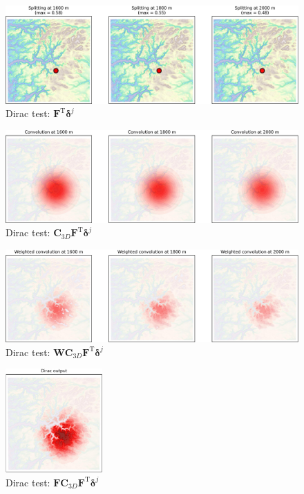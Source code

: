 \documentclass[12pt]{scrartcl}
\begin{document}
\begin{figure}[h!]
\centering
\includegraphics[width=\textwidth]{top_2-split.jpg}
\caption{Dirac test: $\mathbf{F}^\text{T} \boldsymbol{\delta}^j$} \label{fig:top_2-split}
\end{figure}

\begin{figure}[h!]
\centering
\includegraphics[width=\textwidth]{top_3-convolution.jpg}
\caption{Dirac test: $\mathbf{C}_{3D} \mathbf{F}^\text{T} \boldsymbol{\delta}^j$} \label{fig:top_3-convolution}
\end{figure}

\begin{figure}[h!]
\centering
\includegraphics[width=\textwidth]{top_4-weighted_convolution.jpg}
\caption{Dirac test: $\mathbf{W} \mathbf{C}_{3D} \mathbf{F}^\text{T} \boldsymbol{\delta}^j$} \label{fig:top_4-weighted_convolution}
\end{figure}

\begin{figure}[h!]
\centering
\includegraphics[width=0.33\textwidth]{top_5-dirac_output.jpg}
\caption{Dirac test: $\mathbf{F} \mathbf{C}_{3D} \mathbf{F}^\text{T} \boldsymbol{\delta}^j$} \label{fig:top_5-dirac_output}
\end{figure}
\end{document}

